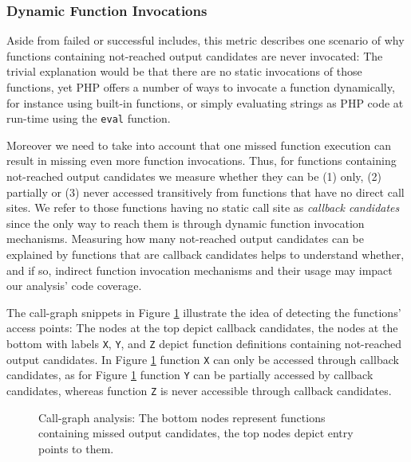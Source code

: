 \documentclass[sigconf]{acmart}
\renewcommand{\tt}[1]{\texttt{#1}}
\begin{document}
\subsubsection{Dynamic Function Invocations}
\label{WhyDidFunctionCallsFail}
Aside from failed or successful includes, this metric describes one scenario of
why functions containing not-reached output candidates are never invocated: The
trivial explanation would be that there are no static invocations of those
functions, yet PHP offers a number of ways to invocate a function dynamically,
for instance using built-in functions, or simply evaluating strings as PHP code
at run-time using the \texttt{eval} function.

Moreover we need to take into account that one missed function execution can
result in missing even more function invocations.
Thus, for functions containing not-reached output candidates we measure whether
they can be (1) only, (2) partially or (3) never accessed transitively from
functions that have no direct call sites. We refer to those functions having no
static call site as \emph{callback candidates} since the only way to reach them
is through dynamic function invocation mechanisms. Measuring how many not-reached output candidates can be explained by functions that are callback
candidates helps to understand whether, and if so, indirect function invocation
mechanisms and their usage may impact our analysis’ code coverage.

The call-graph snippets in Figure \ref{fig:callgraph} illustrate the idea of
detecting the functions’ access points: The nodes at the top depict callback
candidates, the nodes at the bottom with labels \tt{X}, \tt{Y}, and \tt{Z}
depict function definitions containing not-reached output candidates. In Figure
\ref{fig:callgraph} function \tt{X} can only be accessed through callback
candidates, as for Figure \ref{fig:callgraph} function \tt{Y} can be partially
accessed by callback candidates, whereas function \tt{Z} is never accessible
through callback candidates.

\begin{figure}
    
    \caption{Call-graph analysis: The bottom nodes represent functions
    containing missed output candidates, the top nodes depict entry points to
    them.}
    \label{fig:callgraph} 
\end{figure}

\end{document}
